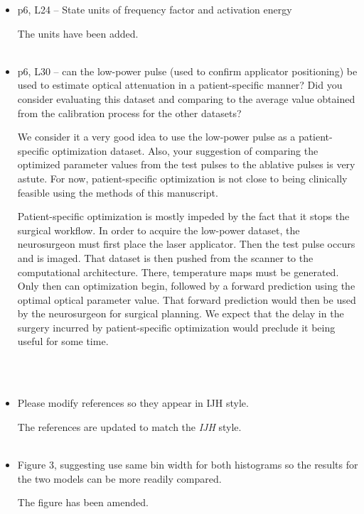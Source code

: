 \documentclass[letterpaper,12pt]{report}
\begin{document}
\begin{itemize}
{\color{red}
The figure has been modified accordingly at
{\color{green}[page and line number]}. 
}\\
\\
\item
p6, L24 -- State units of frequency factor and activation energy

{\color{red}
The units have been added.
}\\
\\
\item
p6, L30 -- can the low-power pulse (used to confirm applicator positioning) be used to estimate optical
attenuation in a patient-specific manner? Did you consider evaluating this dataset and comparing to the
average value obtained from the calibration process for the other datasets?

{\color{red}
We consider it a very good idea to use the low-power pulse as a patient-specific optimization dataset. Also,
your suggestion of comparing the optimized parameter values from the test pulses to the ablative pulses is
very astute. For now, patient-specific optimization is not close to being clinically feasible using the
methods of this manuscript.

Patient-specific optimization is mostly impeded by the fact that it stops the surgical workflow. In order to
acquire the low-power dataset, the neurosurgeon must first place the laser applicator. Then the test pulse
occurs and is imaged. That dataset is then pushed from the scanner to the computational architecture. There,
temperature maps must be generated. Only then can optimization begin, followed by a forward prediction
using the optimal optical parameter value. That forward prediction would then be used by the neurosurgeon for
surgical planning. We expect that the delay in the surgery incurred by patient-specific optimization would
preclude it being useful for some time. 
}\\
\\
\item
Please modify references so they appear in IJH style.

{\color{red}
The references are updated to match the \textit{IJH} style.
}\\
\\
\item
Figure 3, suggesting use same bin width for both histograms so the results for the two models can be
more readily compared.

{\color{red}
The figure has been amended.
}
\end{itemize}
\end{document}
